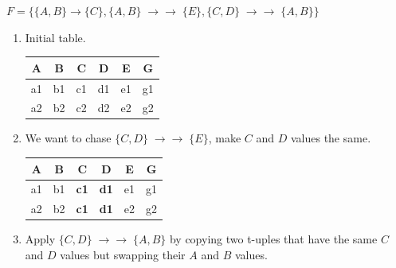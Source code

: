 \documentclass[10pt,a4paper,answers]{exam}
\newcommand {\mvd}{\mbox{$\; \rightarrow \! \! \! \! \rightarrow \; $}}
\newcounter{sol}
\begin{document}
\begin{questions}
$F=\{ \{A, B\} \rightarrow \{C\}, \{A, B\} \mvd \{E\}, \{C, D\} \mvd \{A, B\}\}$


\begin{solution}
	\begin{enumerate}
		\item Initial table.
		\begin{center}
			\centering
			\begin{tabular}{|c|c|c|c|c|c|}
				\hline
				\rowcolor[HTML]{EFEFEF} 
				\textbf{A} & \textbf{B} & \textbf{C} & \textbf{D} & \textbf{E} & {\color[HTML]{333333} \textbf{G}} \\ \hline
				a1         & b1         & c1         & d1         & e1         & g1                                \\ \hline
				a2         & b2         & c2         & d2         & e2         & g2                                \\ \hline
			\end{tabular}
		\end{center}
		\item We want to chase $\{C, D\} \mvd \{E\}$, make $C$ and $D$ values the same.
		\begin{center}
			\centering
			\begin{tabular}{|c|c|c|c|c|c|}
				\hline
				\rowcolor[HTML]{EFEFEF} 
				\textbf{A} & \textbf{B} & \textbf{C} & \textbf{D} & \textbf{E} & {\color[HTML]{333333} \textbf{G}} \\ \hline
				a1         & b1         & \textbf{c1}         & \textbf{d1}         & e1         & g1                                \\ \hline
				a2         & b2         & \textbf{c1}         & \textbf{d1}         & e2         & g2                                \\ \hline
			\end{tabular}
		\end{center}
		\item Apply $\{C, D\} \mvd \{A, B\}$ by copying two t-uples that have the same $C$ and $D$ values but swapping their $A$ and $B$ values.

\end{enumerate}
\end{solution}
\end{questions}
\end{document}
